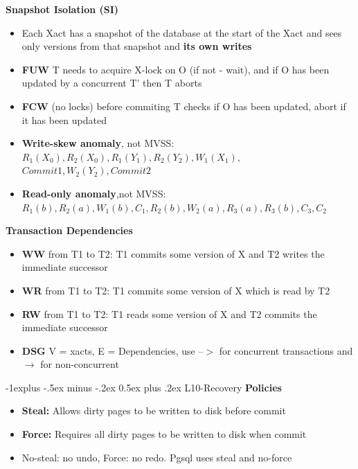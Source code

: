 \documentclass[10pt, landscape]{article}
\makeatletter
\renewcommand{\subsection}{\@startsection{subsection}{2}{0mm}%
                                {-1explus -.5ex minus -.2ex}%
                                {0.5ex plus .2ex}%
                                {\normalfont\normalsize\bfseries}}
\makeatother
\begin{document}
\begin{multicols}{4}
\textbf{Snapshot Isolation (SI)} \\
\begin{itemize}
  \item Each Xact has a snapshot of the database at the start of the Xact and sees only versions from that snapshot and \textbf{its own writes}
  \item \textbf{FUW} T needs to acquire X-lock on O (if not - wait), and if O has been updated by a concurrent T' then T aborts
  \item \textbf{FCW} (no locks) before commiting T checks if O has been updated, abort if it has been updated
  \item \textbf{Write-skew anomaly}, not MVSS: $R_1(X_0), R_2(X_0), R_1(Y_1), R_2(Y_2), W_1(X_1),$ $ Commit1, W_2(Y_2), Commit2$
  \item \textbf{Read-only anomaly},not MVSS: $R_1(b), R_2(a), W_1(b), C_1, R_2(b), W_2(a),R_3(a), R_3(b), C_3, C_2$
\end{itemize}

\textbf{Transaction Dependencies} \\
\begin{itemize}
  \item \textbf{WW} from T1 to T2: T1 commits some version of X and T2 writes the immediate successor
  \item \textbf{WR} from T1 to T2: T1 commits some version of X which is read by T2
  \item \textbf{RW} from T1 to T2: T1 reads some version of X and T2 commits the immediate successor
  \item \textbf{DSG} V = {xacts}, E = {Dependencies}, use --$>$ for concurrent transactions and $\rightarrow$ for non-concurrent
\end{itemize}

\subsection{L10-Recovery}
\textbf{Policies} \\
\begin{itemize}
  \item \textbf{Steal:} Allows dirty pages to be written to disk before commit
  \item \textbf{Force:} Requires all dirty pages to be written to disk when commit
  \item No-steal: no undo, Force: no redo. Pgsql uses steal and no-force
\end{itemize}


\end{multicols}
\end{document}
